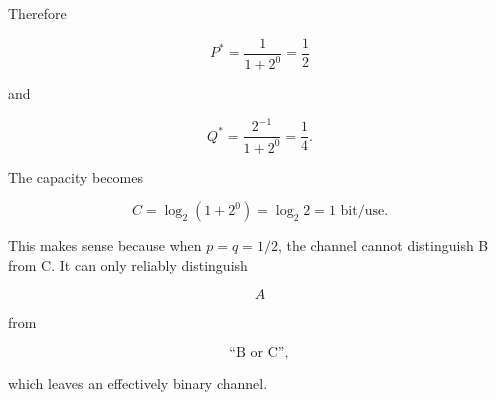 \documentclass[11pt]{article}
\begin{document}
\begin{enumerate}
Therefore

\[
P^*
=
\frac{1}{1+2^{0}}
=
\frac12
\]

and

\[
Q^*
=
\frac{2^{-1}}{1+2^0}
=
\frac14.
\]

The capacity becomes

\[
C
=
\log_2(1+2^0)
=
\log_2 2
=
1\text{ bit/use}.
\]

This makes sense because when \(p=q=1/2\), the channel cannot distinguish B
from C. It can only reliably distinguish

\[
A
\]

from

\[
\text{``B or C''},
\]

which leaves an effectively binary channel.

\end{enumerate}
\end{document}
